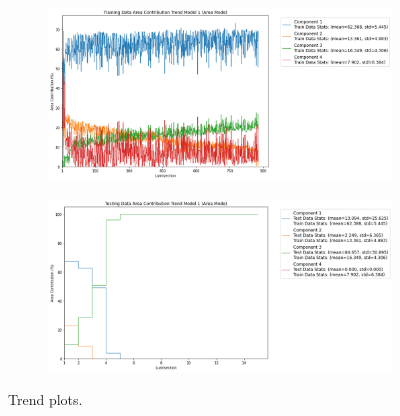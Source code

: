 \begin{figure}[H]
    \centering
    \begin{subfigure}[t]{1\textwidth}
        \centering
        \includegraphics[width=\textwidth]{images/trend_train.png}
    \end{subfigure}
    \hfill
    \begin{subfigure}[t]{1\textwidth}
        \centering
        \includegraphics[width=\textwidth]{images/trend_fake.png}
    \end{subfigure}
    \caption{Trend plots.}
    \label{fig:trend_plots}
\end{figure}

